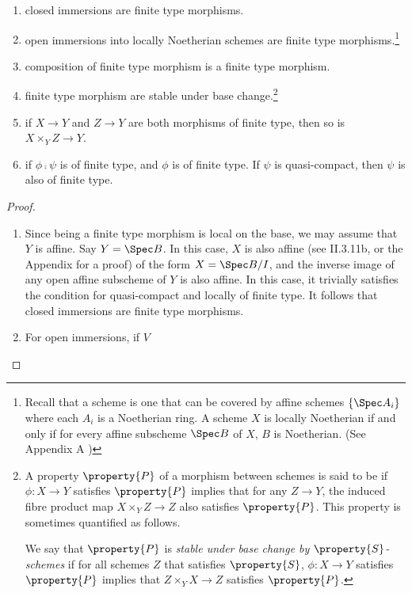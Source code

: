 \begin{cor}
\begin{enumerate}
\item closed immersions are finite type morphisms. 

\item open immersions into locally Noetherian schemes are finite 
type morphisms.\footnote{Recall that a  scheme is one that can be covered 
by affine schemes $\{\Spec A_i\}$ where each $A_i$ is a Noetherian 
ring. A scheme $X$ is locally Noetherian if and only if for every 
affine subscheme $\Spec B$ of $X$, $B$ is Noetherian. (See 
Appendix A )}

\item composition of finite type morphism is a finite type 
morphism.

\item finite type morphism are stable under base change.\footnote{
A property $\property{P}$ of a morphism between schemes is said to 
be  if 
$\phi: X \to Y$ satisfies $\property{P}$ implies that for any $Z 
\to Y$, the induced fibre product map $X \times_Y Z \to Z$ also 
satisfies $\property{P}$. This property is sometimes quantified as 
follows.

We say that $\property{P}$ is \emph{stable under base change by 
$\property{S}$-schemes} if for all schemes $Z$ that satisfies 
$\property{S}$, $\phi : X \to Y$ satisfies $\property{P}$ implies 
that $Z \times_Y X \to Z$ satisfies $\property{P}$.}

\item if $X \to Y$ and $Z \to Y$ are both morphisms of finite
type, then so is $X \times_Y Z \to Y$.

\item if $\phi \comp \psi$ is of finite type, and $\phi$ is of
finite type. If $\psi$ is quasi-compact, then $\psi$ is also
of finite type.
\end{enumerate}
\end{cor}

\begin{proof}
\begin{enumerate}
\item Since being a finite type morphism is local on the base,
we may assume that $Y$ is affine. Say $Y = \Spec B$. In this case, 
$X$ is also affine (see \cite{Hart} II.3.11b, or the Appendix for 
a proof) of the form $X = \Spec B/I$, and the inverse image of any 
open affine subscheme of $Y$ is also affine. In this case, it 
trivially satisfies the condition for quasi-compact and locally of 
finite type. It follows that closed immersions are finite type 
morphisms.

\item For open immersions, if $V$

\end{enumerate}
\end{proof}

